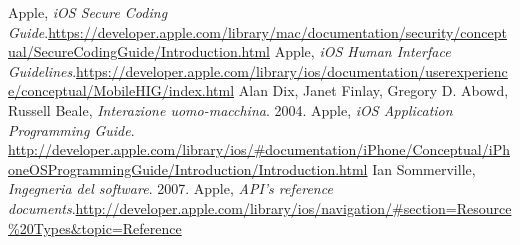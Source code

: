 \documentclass[LaM,binding=0.6cm]{sapthesis}
\newcommand{\bs}{\textbackslash}
\begin{document}
% 
% 
% 
% 
% 

\backmatter

\begin{thebibliography}{}
 Apple, \emph{iOS Secure Coding Guide}.\newline \url{https://developer.apple.com/library/mac/documentation/security/conceptual/SecureCodingGuide/Introduction.html}
 Apple, \emph{iOS Human Interface Guidelines}.\newline \url{https://developer.apple.com/library/ios/documentation/userexperience/conceptual/MobileHIG/index.html}
 Alan Dix, Janet Finlay, Gregory D. Abowd, Russell Beale, \emph{Interazione uomo-macchina}. 2004.
 Apple, \emph{iOS Application Programming Guide}. \newline \url{http://developer.apple.com/library/ios/#documentation/iPhone/Conceptual/iPhoneOSProgrammingGuide/Introduction/Introduction.html}
 Ian Sommerville, \emph{Ingegneria del software}. 2007.
 Apple, \emph{API's reference documents}.\newline \url{http://developer.apple.com/library/ios/navigation/#section=Resource%20Types&topic=Reference}
\end{thebibliography}
\end{document}
